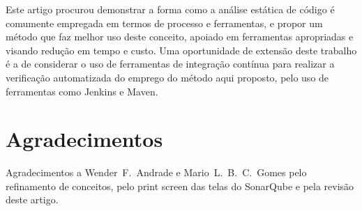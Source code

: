 \documentclass[12pt,journal,compsoc]{IEEEtran}
\begin{document}
Este artigo procurou demonstrar a forma como a análise estática de código é comumente empregada em termos de processo e ferramentas, e propor um método que faz melhor uso deste conceito, apoiado em  ferramentas apropriadas e visando redução em tempo e custo. Uma oportunidade de extensão deste trabalho é a de considerar o uso de ferramentas de integração contínua para realizar a verificação automatizada do emprego do método aqui proposto, pelo uso de ferramentas como Jenkins e Maven.   

\section*{Agradecimentos}

Agradecimentos a Wender~F.~Andrade e Mario~L.~B.~C.~Gomes pelo refinamento de conceitos, pelo print screen das telas do SonarQube e pela revisão deste artigo.




\end{document}
